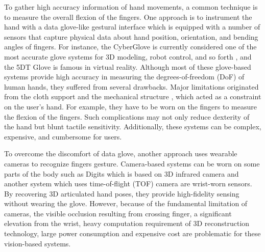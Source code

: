\documentclass{sigchi}
\begin{document}


To gather high accuracy information of hand movements, a common technique is to measure the overall flexion of the fingers. One approach is to instrument the hand with a data glove-like gestural interface \cite{4539650} which is equipped with a number of sensors that capture physical data about hand position, orientation, and bending angles of fingers.
For instance, the CyberGlove is currently considered one of the most accurate glove systems for 3D modeling, robot control, and so forth \cite{Burdea:2003:VRT:829566, LaViola:1999:SHP:864649}, and the 5DT Glove \cite{5DT} is famous in virtual reality. 
Although most of these glove-based systems provide high accuracy in measuring the degrees-of-freedom (DoF) of human hands, they suffered from several drawbacks. 
Major limitations originated from the cloth support and the mechanical structure \cite{4539650}
, which acted as a constraint on the user’s hand. For example, they have to be worn on the fingers to measure the flexion of the fingers. Such complications may not only reduce dexterity of the hand but blunt tactile sensitivity. Additionally, these systems can be complex, expensive, and cumbersome for users.

To overcome the discomfort of data glove, another approach uses wearable cameras to recognize fingers gesture. Camera-based systems can be worn on some parts of the body such as Digits \cite{Kim:2012:DFI:2380116.2380139} which is based on 3D infrared camera and another system \cite{6855631} which uses time-of-flight (TOF) camera are wrist-worn sensors. By recovering 3D articulated hand poses, they provide high-fidelity sensing without wearing the glove. However, because of the fundamental limitation of cameras, the visible occlusion resulting from crossing finger, a significant elevation from the wrist, heavy computation requirement of 3D reconstruction technology, large power consumption and expensive cost are problematic for these vision-based systems.
\end{document}
